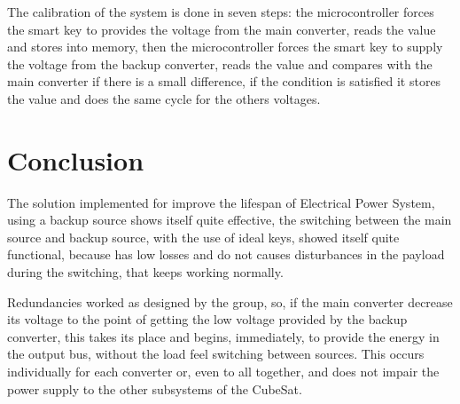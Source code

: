 \documentclass[3p]{elsarticle}
\begin{document}
	The calibration of the system is done in seven steps: the microcontroller forces the smart key to provides the voltage from the main converter, reads the value and stores into memory, then the microcontroller forces the smart key to supply the voltage from the backup converter, reads the value and compares with the main converter if there is a small difference, if the condition is satisfied it stores the value and does the same cycle for the others voltages.

\section{Conclusion}
\label{Conclusion}

	 The solution implemented for improve the lifespan of Electrical Power System, using a backup source shows itself quite effective, the switching between the main source and backup source, with the use of ideal keys, showed itself quite functional, because has low losses and do not causes disturbances in the payload during the switching, that keeps working normally. 
	

	Redundancies worked as designed by the group, so, if the main converter decrease its voltage to the point of getting the low voltage provided by the backup converter, this takes its place and begins, immediately, to provide the energy in the output bus, without the load feel switching between sources. This occurs individually for each converter or, even to all together, and does not impair the power supply to the other subsystems of the CubeSat.

	
\end{document}
